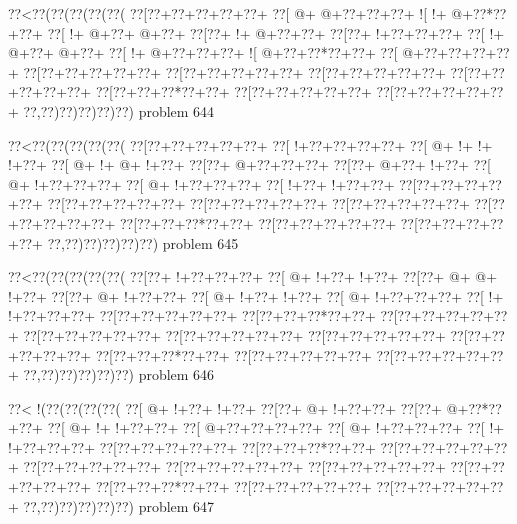 \vbox{\vbox{\goo
\0??<\0??(\0??(\0??(\0??(\0??(
\0??[\0??+\0??+\0??+\0??+\0??+
\0??[\- @+\- @+\0??+\0??+\0??+
\- ![\- !+\- @+\0??*\0??+\0??+
\0??[\- !+\- @+\0??+\- @+\0??+
\0??[\0??+\- !+\- @+\0??+\0??+
\0??[\0??+\- !+\0??+\0??+\0??+
\0??[\- !+\- @+\0??+\- @+\0??+
\0??[\- !+\- @+\0??+\0??+\0??+
\- ![\- @+\0??+\0??*\0??+\0??+
\0??[\- @+\0??+\0??+\0??+\0??+
\0??[\0??+\0??+\0??+\0??+\0??+
\0??[\0??+\0??+\0??+\0??+\0??+
\0??[\0??+\0??+\0??+\0??+\0??+
\0??[\0??+\0??+\0??+\0??+\0??+
\0??[\0??+\0??+\0??*\0??+\0??+
\0??[\0??+\0??+\0??+\0??+\0??+
\0??[\0??+\0??+\0??+\0??+\0??+
\0??,\0??)\0??)\0??)\0??)\0??)
}
\hfil problem 644\hfil\break
}

\vbox{\vbox{\goo
\0??<\0??(\0??(\0??(\0??(\0??(
\0??[\0??+\0??+\0??+\0??+\0??+
\0??[\- !+\0??+\0??+\0??+\0??+
\0??[\- @+\- !+\- !+\- !+\0??+
\0??[\- @+\- !+\- @+\- !+\0??+
\0??[\0??+\- @+\0??+\0??+\0??+
\0??[\0??+\- @+\0??+\- !+\0??+
\0??[\- @+\- !+\0??+\0??+\0??+
\0??[\- @+\- !+\0??+\0??+\0??+
\0??[\- !+\0??+\- !+\0??+\0??+
\0??[\0??+\0??+\0??+\0??+\0??+
\0??[\0??+\0??+\0??+\0??+\0??+
\0??[\0??+\0??+\0??+\0??+\0??+
\0??[\0??+\0??+\0??+\0??+\0??+
\0??[\0??+\0??+\0??+\0??+\0??+
\0??[\0??+\0??+\0??*\0??+\0??+
\0??[\0??+\0??+\0??+\0??+\0??+
\0??[\0??+\0??+\0??+\0??+\0??+
\0??,\0??)\0??)\0??)\0??)\0??)
}
\hfil problem 645\hfil\break
}

\vbox{\vbox{\goo
\0??<\0??(\0??(\0??(\0??(\0??(
\0??[\0??+\- !+\0??+\0??+\0??+
\0??[\- @+\- !+\0??+\- !+\0??+
\0??[\0??+\- @+\- @+\- !+\0??+
\0??[\0??+\- @+\- !+\0??+\0??+
\0??[\- @+\- !+\0??+\- !+\0??+
\0??[\- @+\- !+\0??+\0??+\0??+
\0??[\- !+\- !+\0??+\0??+\0??+
\0??[\0??+\0??+\0??+\0??+\0??+
\0??[\0??+\0??+\0??*\0??+\0??+
\0??[\0??+\0??+\0??+\0??+\0??+
\0??[\0??+\0??+\0??+\0??+\0??+
\0??[\0??+\0??+\0??+\0??+\0??+
\0??[\0??+\0??+\0??+\0??+\0??+
\0??[\0??+\0??+\0??+\0??+\0??+
\0??[\0??+\0??+\0??*\0??+\0??+
\0??[\0??+\0??+\0??+\0??+\0??+
\0??[\0??+\0??+\0??+\0??+\0??+
\0??,\0??)\0??)\0??)\0??)\0??)
}
\hfil problem 646\hfil\break
}

\vbox{\vbox{\goo
\0??<\- !(\0??(\0??(\0??(\0??(
\0??[\- @+\- !+\0??+\- !+\0??+
\0??[\0??+\- @+\- !+\0??+\0??+
\0??[\0??+\- @+\0??*\0??+\0??+
\0??[\- @+\- !+\- !+\0??+\0??+
\0??[\- @+\0??+\0??+\0??+\0??+
\0??[\- @+\- !+\0??+\0??+\0??+
\0??[\- !+\- !+\0??+\0??+\0??+
\0??[\0??+\0??+\0??+\0??+\0??+
\0??[\0??+\0??+\0??*\0??+\0??+
\0??[\0??+\0??+\0??+\0??+\0??+
\0??[\0??+\0??+\0??+\0??+\0??+
\0??[\0??+\0??+\0??+\0??+\0??+
\0??[\0??+\0??+\0??+\0??+\0??+
\0??[\0??+\0??+\0??+\0??+\0??+
\0??[\0??+\0??+\0??*\0??+\0??+
\0??[\0??+\0??+\0??+\0??+\0??+
\0??[\0??+\0??+\0??+\0??+\0??+
\0??,\0??)\0??)\0??)\0??)\0??)
}
\hfil problem 647\hfil\break
}

